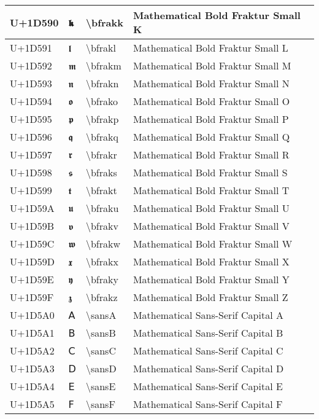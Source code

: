 \begin{table}[h]
\begin{tabulary}{\linewidth}{|L|L|L|L|}
\hline
U+1D590 & 𝖐 & {\textbackslash}bfrakk & Mathematical Bold Fraktur Small K \\
\hline
U+1D591 & 𝖑 & {\textbackslash}bfrakl & Mathematical Bold Fraktur Small L \\
\hline
U+1D592 & 𝖒 & {\textbackslash}bfrakm & Mathematical Bold Fraktur Small M \\
\hline
U+1D593 & 𝖓 & {\textbackslash}bfrakn & Mathematical Bold Fraktur Small N \\
\hline
U+1D594 & 𝖔 & {\textbackslash}bfrako & Mathematical Bold Fraktur Small O \\
\hline
U+1D595 & 𝖕 & {\textbackslash}bfrakp & Mathematical Bold Fraktur Small P \\
\hline
U+1D596 & 𝖖 & {\textbackslash}bfrakq & Mathematical Bold Fraktur Small Q \\
\hline
U+1D597 & 𝖗 & {\textbackslash}bfrakr & Mathematical Bold Fraktur Small R \\
\hline
U+1D598 & 𝖘 & {\textbackslash}bfraks & Mathematical Bold Fraktur Small S \\
\hline
U+1D599 & 𝖙 & {\textbackslash}bfrakt & Mathematical Bold Fraktur Small T \\
\hline
U+1D59A & 𝖚 & {\textbackslash}bfraku & Mathematical Bold Fraktur Small U \\
\hline
U+1D59B & 𝖛 & {\textbackslash}bfrakv & Mathematical Bold Fraktur Small V \\
\hline
U+1D59C & 𝖜 & {\textbackslash}bfrakw & Mathematical Bold Fraktur Small W \\
\hline
U+1D59D & 𝖝 & {\textbackslash}bfrakx & Mathematical Bold Fraktur Small X \\
\hline
U+1D59E & 𝖞 & {\textbackslash}bfraky & Mathematical Bold Fraktur Small Y \\
\hline
U+1D59F & 𝖟 & {\textbackslash}bfrakz & Mathematical Bold Fraktur Small Z \\
\hline
U+1D5A0 & 𝖠 & {\textbackslash}sansA & Mathematical Sans-Serif Capital A \\
\hline
U+1D5A1 & 𝖡 & {\textbackslash}sansB & Mathematical Sans-Serif Capital B \\
\hline
U+1D5A2 & 𝖢 & {\textbackslash}sansC & Mathematical Sans-Serif Capital C \\
\hline
U+1D5A3 & 𝖣 & {\textbackslash}sansD & Mathematical Sans-Serif Capital D \\
\hline
U+1D5A4 & 𝖤 & {\textbackslash}sansE & Mathematical Sans-Serif Capital E \\
\hline
U+1D5A5 & 𝖥 & {\textbackslash}sansF & Mathematical Sans-Serif Capital F \\

\end{tabulary}
\end{table}
